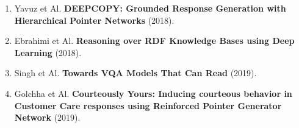 \begin{enumerate}
\item Yavuz et Al.  \newblock
{\bf DEEPCOPY: Grounded Response Generation with Hierarchical Pointer Networks}
   (2018).

\item Ebrahimi et Al.  \newblock
{\bf Reasoning over RDF Knowledge Bases using Deep Learning}
   (2018).

\item Singh et Al.  \newblock
 {\bf Towards VQA Models That Can Read}
   (2019).

\item Golchha et Al.  \newblock
 {\bf Courteously Yours: Inducing courteous behavior in Customer Care responses using Reinforced Pointer Generator Network}
   (2019).

\end{enumerate}
